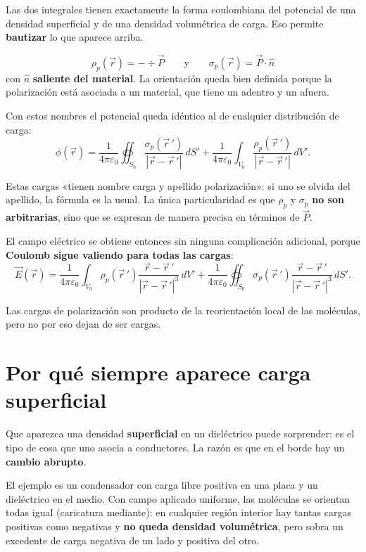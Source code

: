 \documentclass[12pt,a4paper]{article}
\begin{document}
Las dos integrales tienen exactamente la forma coulombiana del potencial de una
densidad superficial y de una densidad volumétrica de carga. Eso permite
\textbf{bautizar} lo que aparece arriba.

\begin{keybox}
\[
\boxed{\ \rho_p(\vec r) = -\div \vec P
\qquad\text{y}\qquad
\sigma_p(\vec r) = \vec P \cdot \hat n \ }
\]
con $\hat n$ \textbf{saliente del material}. La orientación queda bien definida
porque la polarización está asociada a un material, que tiene un adentro y un
afuera.
\end{keybox}

Con estos nombres el potencial queda idéntico al de cualquier distribución de
carga:
\[
\phi(\vec r) = \frac{1}{4\pi\varepsilon_0} \oiint_{S_0}
\frac{\sigma_p(\vec r\,')}{|\vec r - \vec r\,'|}\, dS'
+ \frac{1}{4\pi\varepsilon_0} \int_{V_0}
\frac{\rho_p(\vec r\,')}{|\vec r - \vec r\,'|}\, dV' .
\]

\begin{notebox}
Estas cargas «tienen nombre carga y apellido polarización»: si uno se olvida del
apellido, la fórmula es la usual. La única particularidad es que $\rho_p$ y
$\sigma_p$ \textbf{no son arbitrarias}, sino que se expresan de manera precisa en
términos de $\vec P$.
\end{notebox}

El campo eléctrico se obtiene entonces sin ninguna complicación adicional, porque
\textbf{Coulomb sigue valiendo para todas las cargas}:
\[
\vec E(\vec r) = \frac{1}{4\pi\varepsilon_0} \int_{V_0}
\rho_p(\vec r\,') \frac{\vec r - \vec r\,'}{|\vec r - \vec r\,'|^3}\, dV'
+ \frac{1}{4\pi\varepsilon_0} \oiint_{S_0}
\sigma_p(\vec r\,') \frac{\vec r - \vec r\,'}{|\vec r - \vec r\,'|^3}\, dS' .
\]

Las cargas de polarización son producto de la reorientación local de las
moléculas, pero no por eso dejan de ser cargas.

\section{Por qué siempre aparece carga superficial}

Que aparezca una densidad \textbf{superficial} en un dieléctrico puede
sorprender: es el tipo de cosa que uno asocia a conductores. La razón es que en
el borde hay un \textbf{cambio abrupto}.

El ejemplo es un condensador con carga libre positiva en una placa y un
dieléctrico en el medio. Con campo aplicado uniforme, las moléculas se orientan
todas igual (caricatura mediante): en cualquier región interior hay tantas cargas
positivas como negativas y \textbf{no queda densidad volumétrica}, pero sobra un
excedente de carga negativa de un lado y positiva del otro.
\end{document}
